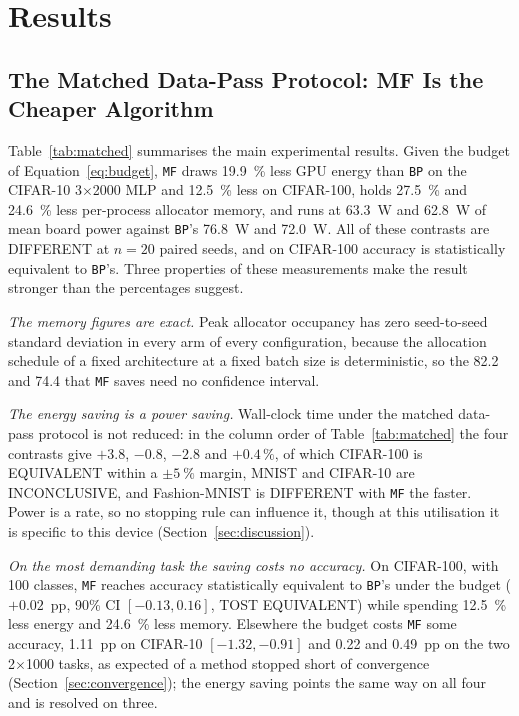 \documentclass{llncs}
\newcommand{\MF}{\texttt{MF}}
\newcommand{\BP}{\texttt{BP}}
\begin{document}
\section{Results}
\label{sec:results}

\subsection{The Matched Data-Pass Protocol: MF Is the Cheaper Algorithm}
\label{sec:matched}

Table~\ref{tab:matched} summarises the main experimental results. Given the budget of
Equation~\ref{eq:budget}, \MF{} draws \SI{19.9}{\percent} less GPU energy than
\BP{} on the CIFAR-10 \num{3}$\times$\num{2000} MLP and \SI{12.5}{\percent}
less on CIFAR-100, holds \SI{27.5}{\percent} and \SI{24.6}{\percent} less
per-process allocator memory, and runs at \SI{63.3}{\watt} and \SI{62.8}{\watt}
of mean board power against \BP{}'s \SI{76.8}{\watt} and \SI{72.0}{\watt}.
All of these contrasts are DIFFERENT at $n=20$ paired seeds, and
on CIFAR-100 accuracy is statistically equivalent to \BP{}'s. Three properties of these measurements make the result stronger than the
percentages suggest.

\emph{The memory figures are exact.} Peak allocator occupancy has zero
seed-to-seed standard deviation in every arm of every configuration, because
the allocation schedule of a fixed architecture at a fixed batch size is
deterministic, so the \SI{82.2}{\mebibyte} and \SI{74.4}{\mebibyte} that \MF{}
saves need no confidence interval.

\emph{The energy saving is a power saving.} Wall-clock time under the matched
data-pass protocol is not reduced: in the column order of Table~\ref{tab:matched} the
four contrasts give $+3.8$, $-0.8$, $-2.8$ and
$+0.4\,\%$, of which CIFAR-100 is EQUIVALENT within a
$\pm\SI{5}{\percent}$ margin, MNIST and CIFAR-10 are INCONCLUSIVE, and
Fashion-MNIST is DIFFERENT with \MF{} the faster.
Power is a rate, so no stopping rule can influence it,
though at this utilisation it is specific to this device
(Section~\ref{sec:discussion}).

\emph{On the most demanding task the saving costs no accuracy.} On CIFAR-100,
with \num{100} classes, \MF{}
reaches accuracy statistically equivalent to \BP{}'s under the budget
($+\num{0.02}$~pp, 90\% CI $[\num{-0.13}, \num{+0.16}]$, TOST EQUIVALENT) while
spending \SI{12.5}{\percent} less energy and \SI{24.6}{\percent} less memory.
Elsewhere the budget costs \MF{}
some accuracy, \num{1.11}~pp on CIFAR-10 $[\num{-1.32}, \num{-0.91}]$ and
\num{0.22} and \num{0.49}~pp on the two \num{2}$\times$\num{1000} tasks, as
expected of a method stopped short of convergence
(Section~\ref{sec:convergence}); the energy saving points the same way on all
four and is resolved on three.
\end{document}
